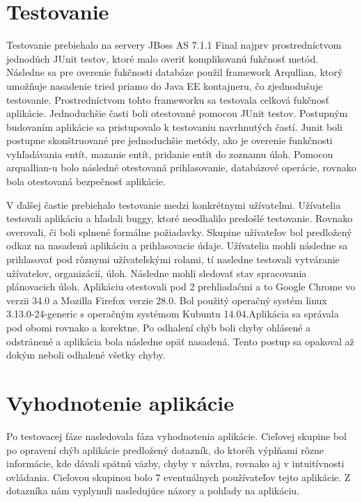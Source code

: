 \section{Testovanie}
Testovanie prebiehalo na servery JBoss AS 7.1.1 Final najprv prostredníctvom jednodúch JUnit testov, ktoré malo overiť komplikovanú fukčnosť metód. Následne sa pre overenie fukčnosti databáze použil framework Arqullian, ktorý umožňuje nasadenie tried priamo do Java EE kontajneru, čo zjednodušuje testovanie. Prostredníctvom tohto frameworku sa testovala celková fukčnosť aplikácie. Jednoduchšie časti boli otestované pomocou JUnit testov. Postupným budovaním aplikácie sa pristupovalo k testovaniu navrhnutých častí. Junit boli postupne skonštruované pre jednoduchšie metódy, ako je overenie funkčnosti vyhľadávania entít, mazanie entít, pridanie entít do zoznamu úloh. Pomocou arquallian-u bolo následné otestovaná prihlasovanie, databázové operácie, rovnako bola otestovaná bezpečnosť aplikácie.


V ďalšej častie prebiehalo testovanie medzi konkrétnymi užívateľmi. Užívatelia testovali aplikáciu a hľadali buggy, ktoré neodhalilo predošlé testovanie. Rovnako overovali, či boli splnené formálne požiadavky. Skupine užívateľov bol predložený odkaz na nasadenú aplikáciu a prihlasovacie údaje. Užívatelia mohli následne sa prihlasovať pod rôznymi užívateľskými rolami, tí nasledne testovali vytváranie užívatelov, organizácií, úloh. Následne mohli sledovať stav spracovania plánovacich úloh. Aplikáciu otestovali pod 2 prehliadačmi a to Google Chrome vo verzii 34.0 a Mozilla Firefox verzie 28.0. Bol použitý operačný systém linux 3.13.0-24-generic s operačným systémom Kubuntu 14.04.Aplikácia sa správala pod obomi rovnako a korektne. Po odhalení chýb boli chyby ohlásené a odstránené a aplikácia bola následne opäť nasadená. Tento postup sa opakoval až dokým neboli odhalené všetky chyby. 




\section{Vyhodnotenie aplikácie}
Po testovacej fáze nasledovala fáza vyhodnotenia aplikácie. Cieľovej skupine bol po opravení chýb aplikácie predložený dotazník, do ktoréh výplňami rôzne informácie, kde dávali spätnú väzby, chyby v návrhu, rovnako aj v intuitívnosti ovládania. Cieľovou skupinou bolo 7 eventuálnych používateľov tejto aplikácie. Z dotazníka nám vyplynuli nasledujúce názory a pohľady na aplikáciu.


















